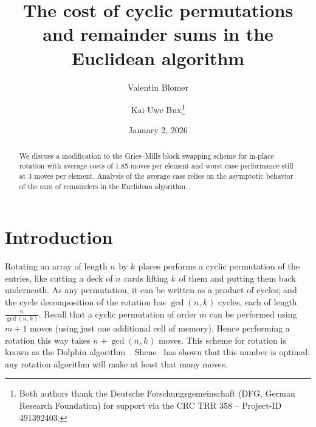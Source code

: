 \documentclass[12pt,a4paper]{article}
\newcommand{\Size}[1][]{n_{#1}}
\newcommand{\Order}{m}
\newcommand{\Shift}[1][]{k_{#1}}
\begin{document}
  \title{The cost of cyclic permutations and remainder sums in the Euclidean algorithm}

  \author{Valentin Blomer \and Kai-Uwe Bux\thanks{Both authors thank the Deutsche
      Forschungsgemeinschaft (DFG, German Research Foundation) for support
      via the CRC TRR 358 – Project-ID 491392403.}%
  }
  
  \date{January 2, 2026}

  \maketitle

  
  \begin{abstract}
    We discuss a modification to the Gries--Mills block swapping
    scheme for in-place rotation with average costs of 1.85 moves per
    element and worst case performance still at 3 moves per element.
    Analysis of the average case relies on the asymptotic behavior of the
    sum of remainders in the Euclidean algorithm.
  \end{abstract}

  \section{Introduction}\label{sec.intro}
  Rotating an array of length $\Size$ by $\Shift$ places performs a
  cyclic permutation of the entries, like cutting a deck of $\Size$
  cards lifting $\Shift$ of them and putting them back underneath. As
  any permutation, it can be written as a product of cycles; and the
  cycle decomposition of the rotation has $\gcd(\Size,\Shift)$ cycles,
  each of length $\frac{\Size}{\gcd(\Size,\Shift)}$. Recall that a
  cyclic permutation of order $\Order$ can be performed using $\Order+1$
  moves (using just one additional cell of memory). Hence performing a
  rotation this way takes $\Size+\gcd(\Size,\Shift)$ moves. This scheme
  for rotation is known as the Dolphin
  algorithm~\cite[Section~4]{GriesMills81}. Shene~\cite{Shene97} has
  shown that this number is optimal: any rotation algorithm will make at
  least that many moves.
\end{document}
